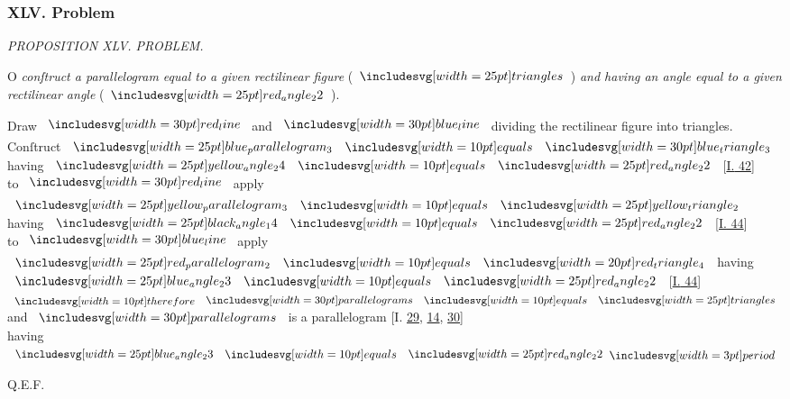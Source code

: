 \documentclass[11pt,preview]{standalone}
\begin{document}
\subsubsection{XLV. Problem}

\begin{minipage}[t]{0.43\textwidth}
    \vspace{20pt}
    
\end{minipage}%
\hfill
\begin{minipage}[t]{0.55\textwidth}
    \begin{center}
        \textit{PROPOSITION XLV. PROBLEM.}\label{book1pr45} \\
    \end{center}

    \hfill

    \begin{center}
        \raggedright \lettrine[lines=3, loversize=1, nindent=0pt]{}{}O \textit{conſtruct a parallelogram equal to a given rectilinear figure} (\hspace{-1ex}$\img{triangles}$\hspace{-1ex}) \textit{and having an angle equal to a given rectilinear angle} (\hspace{-1ex}$\img{red_angle_22}$\hspace{-1ex}).
    \end{center}
\end{minipage}

\hfill

\begin{center}
    Draw $\redline$ and $\blueline$ dividing the rectilinear figure into triangles.
    Conſtruct $\img{blue_parallelogram_3} \bequals \img[0][0][30]{blue_triangle_3}$ having $\img{yellow_angle_24} \bequals \img{red_angle_22}$ [\hyperref[book1pr42]{\textsc{I.} 42}]\\
    to $\redline$ apply $\img{yellow_parallelogram_3} \bequals \img{yellow_triangle_2}$ having  $\img{black_angle_14} \bequals \img{red_angle_22}$ [\hyperref[book1pr44]{\textsc{I.} 44}]\\
    to $\blueline$ apply $\img{red_parallelogram_2} \bequals \img[0][0][20]{red_triangle_4}$ having $\img{blue_angle_23} \bequals \img{red_angle_22}$ [\hyperref[book1pr44]{\textsc{I.} 44}]\\
    $\btherefore \img[0][0][30]{parallelograms} \bequals \img{triangles}$ and $\img[0][0][30]{parallelograms}$ is a parallelogram [\textsc{I.} \hyperref[book1pr29]{29}, \hyperref[book1pr14]{14}, \hyperref[book1pr30]{30}]\\
    having $\img{blue_angle_23} \bequals \img{red_angle_22} \bperiod$
\end{center}

\hfill

\hfill Q.E.F.
\end{document}
